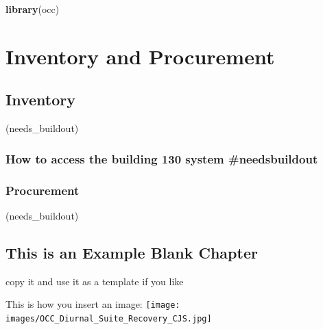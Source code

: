 \documentclass[]{book}
\newenvironment{Shaded}{\begin{snugshade}}{\end{snugshade}}
\newcommand{\KeywordTok}[1]{\textcolor[rgb]{0.13,0.29,0.53}{\textbf{#1}}}
\newcommand{\NormalTok}[1]{#1}
\begin{document}
\begin{Shaded}
\begin{Highlighting}[]
\KeywordTok{library}\NormalTok{(occ)}
\end{Highlighting}
\end{Shaded}

\hypertarget{part-inventory-and-procurement}{%
\part*{Inventory and Procurement}\label{part-inventory-and-procurement}}

\hypertarget{inventory}{%
\chapter{Inventory}\label{inventory}}

(needs\_buildout)

\hypertarget{how-to-access-the-building-130-system-needsbuildout}{%
\section{How to access the building 130 system \#needsbuildout}\label{how-to-access-the-building-130-system-needsbuildout}}

\hypertarget{procurement}{%
\section{Procurement}\label{procurement}}

(needs\_buildout)

\hypertarget{this-is-an-example-blank-chapter}{%
\chapter{This is an Example Blank Chapter}\label{this-is-an-example-blank-chapter}}

copy it and use it as a template if you like

This is how you insert an image:
\texttt{[image: images/OCC\_Diurnal\_Suite\_Recovery\_CJS.jpg]}
\end{document}

